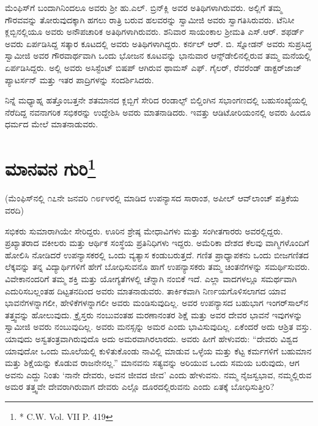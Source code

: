 ಮೆಂಫಿಸ್​ಗೆ ಬಂದಾಗಿನಿಂದಲೂ ಅವರು ಶ‍್ರೀ ಹು.ಎಲ್​. ಬ್ರಿನ್​ಕ್ಲಿ ಅವರ ಅತಿಥಿಗಳಾಗಿ\break ರುವರು. ಅಲ್ಲಿಗೆ ತಮ್ಮ ಗೌರವವನ್ನು ತೋರುವುದಕ್ಕಾಗಿ ಹಗಲು ರಾತ್ರಿ ಬರುವ ಹಲವರನ್ನು ಸ್ವಾಮೀಜಿ ಅವರು ಸ್ವಾಗತಿಸಿರುವರು. ಟೆನಿಸೀ ಕ್ಲಬ್ಬಿನಲ್ಲಿಯೂ ಅವರು ಅನೌಪಚಾರಿಕ ಅತಿಥಿಗಳಾಗಿರುವರು. ಶನಿವಾರ ಸಾಯಂಕಾಲ ಶ‍್ರೀಮತಿ ಎಸ್​.ಆರ್​. ಶಫರ್ಡ್​ ಅವರು ಏರ್ಪಡಿಸಿದ್ದ ಸತ್ಕಾರ ಕೂಟದಲ್ಲಿ ಅವರು ಅತಿಥಿಗಳಾಗಿದ್ದರು. ಕರ್ನಲ್​ ಆರ್​. ಬಿ. ಸ್ನೋಡನ್​ ಅವರು ಸುಪ್ರಸಿದ್ಧ ಸ್ವಾಮೀಜಿ ಅವರ ಗೌರವಾರ್ಥವಾಗಿ ಒಂದು ಭೋಜನ ಕೂಟವನ್ನು ಭಾನುವಾರ ಆನ್ಸ್​ಡೇಲಿನಲ್ಲಿರುವ ತಮ್ಮ ಮನೆಯಲ್ಲಿ ಏರ್ಪಡಿಸಿದ್ದರು. ಅಲ್ಲಿ ಅವರು ಅಸಿಸ್ಟೆಂಟ್​ ಬಿಷಪ್​ ಆಗಿರುವ ಥಾಮಸ್​ ಎಫ್​. ಗೈಲರ್​, ರೆವರೆಂಡ್​ ಡಾಕ್ಟರ್​ ಜಾಜ್​ ಪ್ಯಾಟರ್ಸನ್​ ಮತ್ತು ಇತರ ಪಾದ್ರಿಗಳನ್ನು ಸಂದರ್ಶಿಸಿದರು.

ನಿನ್ನೆ ಮಧ್ಯಾಹ್ನ ಹತ್ತೊಂಬತ್ತನೇ ಶತಮಾನದ ಕ್ಲಬ್ಬಿಗೆ ಸೇರಿದ ರಂಡಾಲ್ಫ್​ ಬಿಲ್ಡಿಂಗಿನ ಸಭಾಂಗಣದಲ್ಲಿ ಬಹುಸಂಖ್ಯೆಯಲ್ಲಿ ನೆರೆದಿದ್ದ ನವನಾಗರಿಕ ಸಭಿಕರನ್ನು ಉದ್ದೇಶಿಸಿ ಅವರು ಮಾತನಾಡಿದರು. ಇವತ್ತು ಆಡಿಟೋರಿಯಂನಲ್ಲಿ ಅವರು ಹಿಂದೂ ಧರ್ಮದ ಮೇಲೆ ಮಾತನಾಡುವರು.

\delimiter


\section[ಮಾನವನ ಗುರಿ]{ಮಾನವನ ಗುರಿ\protect\footnote{* C.W. Vol. VII P. 419}}

\begin{center}
(ಮೆಂಫಿಸ್​ನಲ್ಲಿ ೧೭ನೇ ಜನವರಿ ೧೮೯೪ರಲ್ಲಿ ಮಾಡಿದ ಉಪನ್ಯಾಸದ ಸಾರಾಂಶ, ಅಪೀಲ್​ ಆವ್​ಲಾಂಚ್​ ಪತ್ರಿಕೆಯ ವರದಿ)
\end{center}

ಸಭಿಕರು ಸುಮಾರಾಗಿಯೇ ಸೇರಿದ್ದರು. ಊರಿನ ಶ್ರೇಷ್ಠ ಮೇಧಾವಿಗಳು ಮತ್ತು ಸಂಗೀತಗಾರರು ಅವರಲ್ಲಿದ್ದರು. ಪ್ರಖ್ಯಾತರಾದ ವಕೀಲರು ಮತ್ತು ಆರ್ಥಿಕ ಸಂಸ್ಥೆಯ ಪ್ರತಿನಿಧಿಗಳು ಇದ್ದರು. ಅಮೆರಿಕಾ ದೇಶದ ಕೆಲವು ವಾಗ್ಮಿಗಳೊಂದಿಗೆ ಹೋಲಿಸಿ ನೋಡಿದರೆ ಉಪನ್ಯಾಸಕರಲ್ಲಿ ಒಂದು ವ್ಯತ್ಯಾಸ ಕಂಡುಬರುತ್ತದೆ. ಗಣಿತ ಪ್ರಾಧ್ಯಾಪಕನು ಒಂದು ಬೀಜಗಣಿತದ ಲೆಕ್ಕವನ್ನು ತನ್ನ ವಿದ್ಯಾರ್ಥಿಗಳಿಗೆ ಹೇಗೆ ಬೋಧಿಸುವನೊ ಹಾಗೆ ಉಪನ್ಯಾಸಕರು ತಮ್ಮ ಚಿಂತನೆಗಳನ್ನು ಸಮರ್ಥಿಸುವರು. ವಿವೇಕಾನಂದರಿಗೆ ತಮ್ಮ ಶಕ್ತಿ ಮತ್ತು ಯೋಗ್ಯತೆಗಳಲ್ಲಿ ಚೆನ್ನಾಗಿ ನಂಬಿಕೆ ಇದೆ. ಎಲ್ಲಾ ವಾದಗಳಲ್ಲೂ ಸಮರ್ಥವಾಗಿ ಎದುರಿಸ\break ಬಲ್ಲಂತಹ ದಿಟ್ಟತನದಿಂದ ಅವರು ಮಾತನಾಡುವರು. ತಾರ್ಕಿಕವಾಗಿ ನಿರ್ಣಯಗೊಳಿಸ\break ಲಾಗದ ಯಾವ ಭಾವನೆಗಳನ್ನಾಗಲೀ, ಹೇಳಿಕೆಗಳನ್ನಾಗಲೀ ಅವರು ಮಂಡಿಸುವುದಿಲ್ಲ. ಅವರ ಉಪನ್ಯಾಸದ ಬಹುಭಾಗ ಇಂಗರ್​ಸಾಲ್​ನ ತತ್ತ್ವವನ್ನು ಹೋಲುವುದು. ಕ್ರೈಸ್ತರು ನಂಬುವಂತಹ ಮರಣಾನಂತರ ಶಿಕ್ಷೆ ಮತ್ತು ಅವರ ದೇವರ ಭಾವನೆ ಇವುಗಳನ್ನು ಸ್ವಾಮೀಜಿ ಅವರು ನಂಬುವುದಿಲ್ಲ. ಅವರು ಮನಸ್ಸನ್ನು ಅಮರ ಎಂದು ಭಾವಿಸುವುದಿಲ್ಲ. ಏಕೆಂದರೆ ಅದು ಆಶ್ರಿತ ವಸ್ತು. ಯಾವುದು ಅಸ್ವತಂತ್ರವಾಗಿರುವುದೊ ಅದು ಅಮರವಾಗಿರಲಾರದು. ಅವರು ಹೀಗೆ ಹೇಳುವರು: “ದೇವರು ವಿಶ್ವದ ಯಾವುದೋ ಒಂದು ಮೂಲೆಯಲ್ಲಿ ಕುಳಿತುಕೊಂಡು ನಾವಿಲ್ಲಿ ಮಾಡುವ ಒಳ್ಳೆಯ ಮತ್ತು ಕೆಟ್ಟ ಕರ್ಮಗಳಿಗೆ ಬಹುಮಾನ ಮತ್ತು ಶಿಕ್ಷೆಯನ್ನು ಕೊಡುವ ರಾಜನೇನಲ್ಲ.” ಮಾನವನು ಸತ್ಯವನ್ನು ಅರಿಯುವ ಒಂದು ಸಮಯ ಬರುವುದು, ಆಗ ಅವನು ಎದ್ದು ನಿಂತು ‘ನಾನೇ ದೇವರು, ಅವನ ಜೀವದ ಜೀವ’ ಎಂದು ಹೇಳುವನು. ನಮ್ಮ ನೈಜಸ್ವಭಾವ, ನಮ್ಮಲ್ಲಿರುವ ಅಮರ ತತ್ತ್ವವೇ ದೇವರಾಗಿರುವಾಗ ದೇವರು ಎಲ್ಲೊ ದೂರದಲ್ಲಿರುವನು ಎಂದು ಏತಕ್ಕೆ ಬೋಧಿಸುತ್ತೀರಿ?

